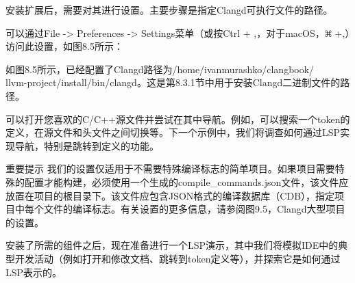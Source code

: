 安装扩展后，需要对其进行设置。主要步骤是指定Clangd可执行文件的路径。

可以通过File -> Preferences -> Settings菜单（或按Ctrl + ,，对于macOS，\includegraphics[width=0.02\textwidth]{content/part2/chapter8/images/3.png} +,）访问此设置，如图8.5所示：


如图8.5所示，已经配置了Clangd路径为/home/ivanmurashko/clangbook/\\llvm-project/install/bin/clangd。这是第8.3.1节中用于安装Clangd二进制文件的路径。

可以打开您喜欢的C/C++源文件并尝试在其中导航。例如，可以搜索一个token的定义，在源文件和头文件之间切换等。下一个示例中，我们将调查如何通过LSP实现导航，特别是跳转到定义的功能。

\begin{myNotic}{重要提示}
我们的设置仅适用于不需要特殊编译标志的简单项目。如果项目需要特殊的配置才能构建，必须使用一个生成的compile\_commands.json文件，该文件应放置在项目的根目录下。该文件应包含JSON格式的编译数据库（CDB），指定项目中每个文件的编译标志。有关设置的更多信息，请参阅图9.5，Clangd大型项目的设置。
\end{myNotic}

安装了所需的组件之后，现在准备进行一个LSP演示，其中我们将模拟IDE中的典型开发活动（例如打开和修改文档、跳转到token定义等），并探索它是如何通过LSP表示的。











































































